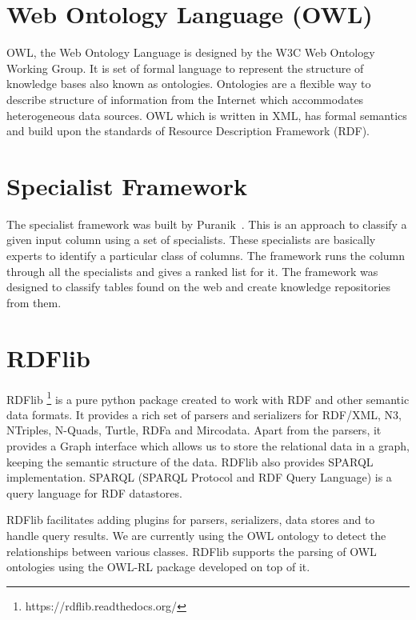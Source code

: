 \section{Web Ontology Language (OWL)}

OWL, the Web Ontology Language is designed by the W3C Web Ontology Working Group. It is set of formal language to represent the structure of knowledge bases also known as ontologies. Ontologies are a flexible way to describe structure of information from the Internet which accommodates heterogeneous data sources. OWL which is written in XML, has formal semantics and build upon the standards of Resource Description Framework (RDF).

\section{Specialist Framework}

The specialist framework was built by Puranik~\cite{puranik2012specialist}. This is an approach to classify a given input column using a set of specialists. These specialists are basically experts to identify a particular class of columns. The framework runs the column through all the specialists and gives a ranked list for it. The framework was designed to classify tables found on the web and create knowledge repositories from them.

\section{RDFlib}

RDFlib \footnote{https://rdflib.readthedocs.org/} is a pure python package created to work with RDF and other semantic data formats. It provides a rich set of parsers and serializers for RDF/XML, N3, NTriples, N-Quads, Turtle, RDFa and Mircodata. Apart from the parsers, it provides a Graph interface which allows us to store the relational data in a graph, keeping the semantic structure of the data. RDFlib also provides SPARQL implementation. SPARQL (SPARQL Protocol and RDF Query Language) is a query language for RDF datastores. 

RDFlib facilitates adding plugins for parsers, serializers, data stores and to handle query results. We are currently using the OWL ontology to detect the relationships between various classes. RDFlib supports the parsing of OWL ontologies using the OWL-RL package developed on top of it.
